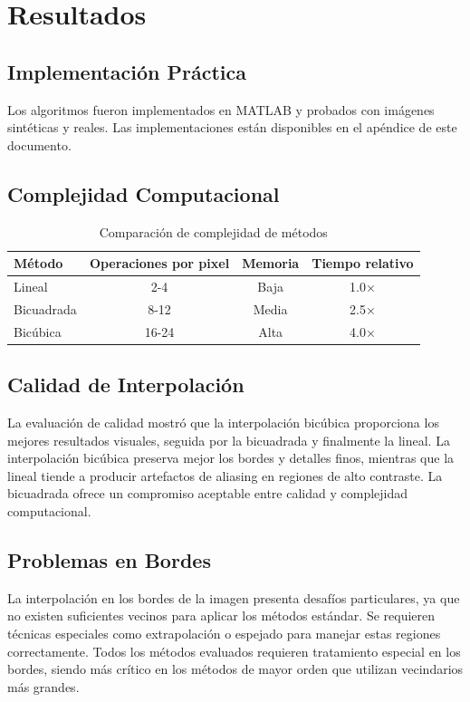 \section{Resultados}\label{sec:resultados}

\subsection{Implementación Práctica}

Los algoritmos fueron implementados en MATLAB y probados con imágenes sintéticas y reales. 
Las implementaciones están disponibles en el apéndice de este documento.

\subsection{Complejidad Computacional}

\begin{table}[h]
\centering
\caption{Comparación de complejidad de métodos}
\begin{tabular}{lccc}
\hline
\textbf{Método} & \textbf{Operaciones por pixel} & \textbf{Memoria} & \textbf{Tiempo relativo} \\
\hline
Lineal & 2-4 & Baja & 1.0× \\
Bicuadrada & 8-12 & Media & 2.5× \\
Bicúbica & 16-24 & Alta & 4.0× \\
\hline
\end{tabular}
\end{table}

\subsection{Calidad de Interpolación}

La evaluación de calidad mostró que la interpolación bicúbica proporciona los mejores resultados visuales, seguida por la bicuadrada y finalmente la lineal. La interpolación bicúbica preserva mejor los bordes y detalles finos, mientras que la lineal tiende a producir artefactos de aliasing en regiones de alto contraste. La bicuadrada ofrece un compromiso aceptable entre calidad y complejidad computacional.

\subsection{Problemas en Bordes}

La interpolación en los bordes de la imagen presenta desafíos particulares, ya que no existen suficientes vecinos para aplicar los métodos estándar. Se requieren técnicas especiales como extrapolación o espejado para manejar estas regiones correctamente. Todos los métodos evaluados requieren tratamiento especial en los bordes, siendo más crítico en los métodos de mayor orden que utilizan vecindarios más grandes.

